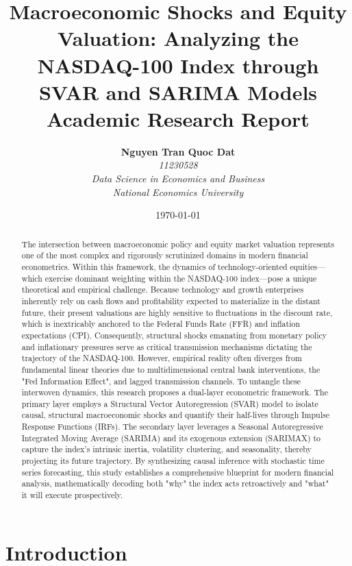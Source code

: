 \documentclass[12pt,a4paper]{report}
\title{
    \vspace*{1cm}
    \huge \textbf{Macroeconomic Shocks and Equity Valuation: Analyzing the NASDAQ-100 Index through SVAR and SARIMA Models} \\
    \vspace*{1cm}
    \Large Academic Research Report
    \vspace*{1.5cm}
}
\author{
    \textbf{Nguyen Tran Quoc Dat} \\ 
    \textit{11230528} \\
    \textit{Data Science in Economics and Business} \\ 
    \textit{National Economics University}
}
\date{\vspace*{1.5cm} \today}
\begin{document}
\maketitle

\begin{abstract}
\noindent The intersection between macroeconomic policy and equity market valuation represents one of the most complex and rigorously scrutinized domains in modern financial econometrics. Within this framework, the dynamics of technology-oriented equities—which exercise dominant weighting within the NASDAQ-100 index—pose a unique theoretical and empirical challenge. Because technology and growth enterprises inherently rely on cash flows and profitability expected to materialize in the distant future, their present valuations are highly sensitive to fluctuations in the discount rate, which is inextricably anchored to the Federal Funds Rate (FFR) and inflation expectations (CPI). Consequently, structural shocks emanating from monetary policy and inflationary pressures serve as critical transmission mechanisms dictating the trajectory of the NASDAQ-100. However, empirical reality often diverges from fundamental linear theories due to multidimensional central bank interventions, the "Fed Information Effect", and lagged transmission channels. To untangle these interwoven dynamics, this research proposes a dual-layer econometric framework. The primary layer employs a Structural Vector Autoregression (SVAR) model to isolate causal, structural macroeconomic shocks and quantify their half-lives through Impulse Response Functions (IRFs). The secondary layer leverages a Seasonal Autoregressive Integrated Moving Average (SARIMA) and its exogenous extension (SARIMAX) to capture the index's intrinsic inertia, volatility clustering, and seasonality, thereby projecting its future trajectory. By synthesizing causal inference with stochastic time series forecasting, this study establishes a comprehensive blueprint for modern financial analysis, mathematically decoding both "why" the index acts retroactively and "what" it will execute prospectively.
\end{abstract}

\tableofcontents
\listoffigures
\listoftables
\newpage

\chapter{Introduction}
\end{document}
